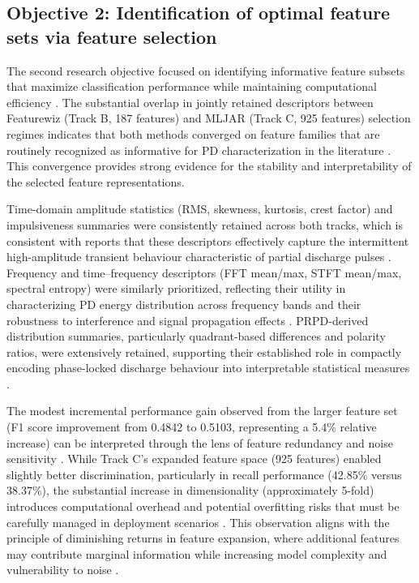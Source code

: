 \subsection{Objective 2: Identification of optimal feature sets via feature selection}

The second research objective focused on identifying informative feature subsets that maximize classification performance while maintaining computational efficiency \parencite{Zhang_2024_28, Seitz_2024_1}. The substantial overlap in jointly retained descriptors between Featurewiz (Track B, 187 features) and MLJAR (Track C, 925 features) selection regimes indicates that both methods converged on feature families that are routinely recognized as informative for PD characterization in the literature \parencite{Aldosari_2023, Long_2024}. This convergence provides strong evidence for the stability and interpretability of the selected feature representations.

Time-domain amplitude statistics (RMS, skewness, kurtosis, crest factor) and impulsiveness summaries were consistently retained across both tracks, which is consistent with reports that these descriptors effectively capture the intermittent high-amplitude transient behaviour characteristic of partial discharge pulses \parencite{Agarwal_2023, Choudhary_2024_1}. Frequency and time--frequency descriptors (FFT mean/max, STFT mean/max, spectral entropy) were similarly prioritized, reflecting their utility in characterizing PD energy distribution across frequency bands and their robustness to interference and signal propagation effects \parencite{Friebe_2024, Bao_2024_1}. PRPD-derived distribution summaries, particularly quadrant-based differences and polarity ratios, were extensively retained, supporting their established role in compactly encoding phase-locked discharge behaviour into interpretable statistical measures \parencite{Orellana_2023_1, Seitz_2024_1}.

The modest incremental performance gain observed from the larger feature set (F1 score improvement from 0.4842 to 0.5103, representing a 5.4\% relative increase) can be interpreted through the lens of feature redundancy and noise sensitivity \parencite{Klein_2024_1, Long_2024}. While Track C's expanded feature space (925 features) enabled slightly better discrimination, particularly in recall performance (42.85\% versus 38.37\%), the substantial increase in dimensionality (approximately 5-fold) introduces computational overhead and potential overfitting risks that must be carefully managed in deployment scenarios \parencite{Srivastava_2023_1, Sikorski_2025}. This observation aligns with the principle of diminishing returns in feature expansion, where additional features may contribute marginal information while increasing model complexity and vulnerability to noise \parencite{Long_2024, Klein_2024_1}.

